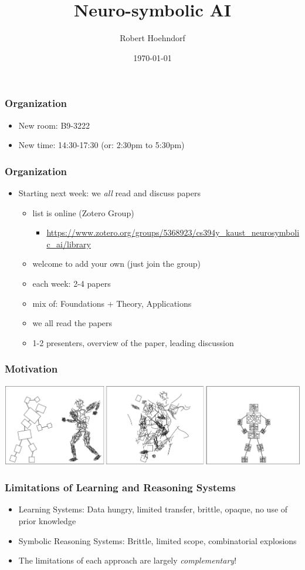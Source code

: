 \documentclass{beamer}
\title{Neuro-symbolic AI}
\author{Robert Hoehndorf}
\date{\today}
\begin{document}
\frame{\titlepage}

\begin{frame}
\frametitle{Organization}
\begin{itemize}
\item New room: B9-3222
\item New time: 14:30-17:30 (or: 2:30pm to 5:30pm)
\end{itemize}
\end{frame}

\begin{frame}
\frametitle{Organization}
\begin{itemize}
\item Starting next week: we {\em all} read and discuss papers
  \begin{itemize}
  \item list is online (Zotero Group)
    \begin{itemize}
    \item \url{https://www.zotero.org/groups/5368923/cs394y_kaust_neurosymbolic_ai/library}
    \end{itemize}
  \item welcome to add your own (just join the group)
  \item each week: 2-4 papers
  \item mix of: Foundations + Theory, Applications
  \item we all read the papers
  \item 1-2 presenters, overview of the paper, leading discussion
  \end{itemize}
\end{itemize}
\end{frame}


\begin{frame}
  \frametitle{Motivation}
  \includegraphics[width=\textwidth]{minsky-figure.png}
\end{frame}

\begin{frame}
\frametitle{Limitations of Learning and Reasoning Systems}
\begin{itemize}
\item Learning Systems: Data hungry, limited transfer, brittle,
  opaque, no use of prior knowledge
\item Symbolic Reasoning Systems: Brittle, limited scope,
  combinatorial explosions
  \pause
\item The limitations of each approach are largely {\em
    complementary}!
\end{itemize}
\end{frame}
\end{document}
